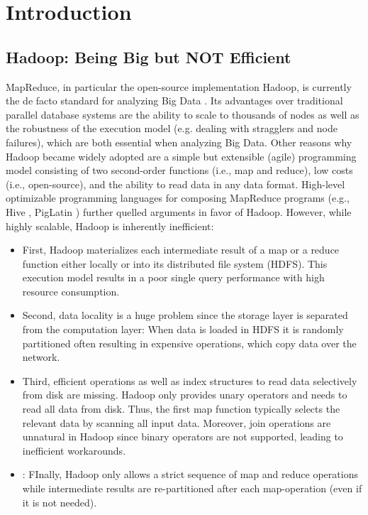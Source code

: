 \documentclass{sig-alternate}
\begin{document}
\section{Introduction}
\label{sec:intro}

\subsection{Hadoop: Being Big but NOT Efficient}
\label{sec:intro:hadoop}

MapReduce, in particular the open-source implementation Hadoop, is currently the de facto standard for analyzing Big Data \cite{MapReduce:CACM:08, Hadoop:OReilly:09}. Its advantages over traditional parallel database systems are the ability to scale to thousands of nodes as well as the robustness of the execution model (e.g. dealing with stragglers and node failures), which are both essential when analyzing Big Data. Other reasons why Hadoop became widely adopted are a simple but extensible (agile) programming model consisting of two second-order functions (i.e., map and reduce), low costs (i.e., open-source), and the ability to read data in any data format. High-level optimizable programming languages for composing MapReduce programs (e.g., Hive \cite{Hive:ICDE:2010}, PigLatin \cite{Pig:PVLDB:2009}) further quelled arguments in favor of Hadoop. However, while highly scalable, Hadoop is inherently inefficient:

\vspace{-1.5ex}
\begin{itemize}
\setlength{\itemsep}{-1.5pt}
\item First, Hadoop materializes each intermediate result of a map or a reduce function either locally or into its distributed file system (HDFS). This execution model results in a poor single query performance with high resource consumption. 
\item Second, data locality is a huge problem since the storage layer is separated from the computation layer: When data is loaded in HDFS it is randomly partitioned often resulting in expensive operations, which copy data over the network.
\item Third, efficient operations as well as index structures to read data selectively from disk are missing. Hadoop only provides unary operators and needs to read all data from disk. Thus, the first map function typically selects the relevant data by scanning all input data. Moreover, join operations are unnatural in Hadoop since binary operators are not supported, leading to inefficient workarounds. 
\item: FInally, Hadoop only allows a strict sequence of map and reduce operations while intermediate results are re-partitioned after each map-operation (even if it is not needed).
\end{itemize}
\vspace{-2ex}
\end{document}
